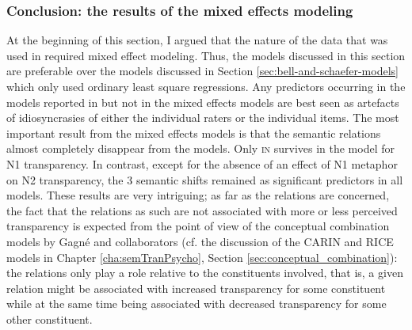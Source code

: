\subsubsection{Conclusion: the results of the mixed effects modeling}
\label{sec:results-of-mixed-effect-models}

At the beginning of this section, I argued that the nature of the data
that was used in \citet{BellandSchaefer:2013} required mixed effect
modeling. Thus, the models discussed in this section are preferable over the models discussed in Section \ref{sec:bell-and-schaefer-models} which only used ordinary least square regressions.
Any predictors occurring in the models reported in
\citet{BellandSchaefer:2013} but not in the mixed effects models are
best seen as artefacts of idiosyncrasies of either
the individual raters or the individual items. The most important
result from the mixed effects models is that the semantic relations
almost completely disappear from the models. Only \textsc{in} survives in the
model for N1 transparency. In contrast, except for the absence of an
effect of N1 metaphor on N2 transparency, the 3 semantic shifts
remained as significant predictors in all models. These results are
very intriguing; as far as the relations are concerned, the fact that
the relations as such are not associated with more or less perceived
transparency is expected from the point of view of the conceptual
combination models by Gagné and collaborators (cf. the discussion of
the CARIN and RICE models in Chapter
\ref{cha:semTranPsycho}, Section \ref{sec:conceptual_combination}):
the relations only play a role relative to the constituents involved,
that is, a given relation might be associated with increased
transparency for some constituent while at the same time being
associated with decreased transparency for some other constituent. 

